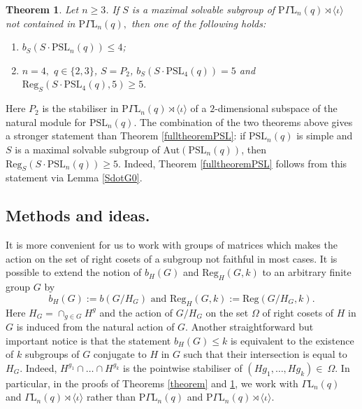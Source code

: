 \documentclass[a4paper,reqno,11pt]{amsart}
\newtheorem{mainthA}{Theorem}
\theoremstyle{definition}
\theoremstyle{remark}
\numberwithin{equation}{section}
\newcommand{\Reg}{\mathrm{Reg}}
\newcommand{\Aut}{\mathrm{Aut}}
\newcommand{\GaL}{{\Gamma \mathrm{L}}}
\newcommand{\PGaL}{{\mathrm{P}\Gamma \mathrm{L}}}
\newcommand{\PSL}{{\mathrm{PSL}}}
\begin{document}
\begin{mainthA}
\label{theoremGR}
Let $n\ge 3$. If $S$ is a maximal solvable subgroup of $\PGaL_n(q) \rtimes \langle \iota \rangle$ not contained in $\PGaL_n(q),$ then one of the following holds:
\begin{enumerate}
\item[$(1)$] $b_S(S \cdot \PSL_n(q))\le 4$;
\item[$(2)$] $n=4,$ $q\in \{2,3\}$, $S=P_2$, $b_S(S \cdot \PSL_4(q))=5$ and $\Reg_S(S \cdot \PSL_4(q),5)\ge 5.$
\end{enumerate}
\end{mainthA}

Here $P_2$ is the stabiliser in $\PGaL_n(q) \rtimes \langle \iota \rangle$ of a $2$-dimensional subspace of the natural module for $\PSL_n(q).$ The combination of the two theorems above gives a stronger statement than Theorem \ref{fulltheoremPSL}: if $\PSL_n(q)$ is simple and $S$ is a maximal solvable subgroup of $\Aut(\PSL_n(q))$, then $\Reg_S(S \cdot \PSL_n(q)) \ge 5.$ Indeed, Theorem \ref{fulltheoremPSL} follows from this statement via Lemma \ref{SdotG0}. 

\subsection{Methods and ideas.}\label{secmeth}

 It is more convenient for us to work with groups of matrices which makes the action  on the set of right cosets of a subgroup not faithful in most cases.  It is possible to extend the notion of $b_H(G)$ and $\Reg_H(G,k)$ to an arbitrary finite group $G$ by 
  $$b_H(G):=b(G/H_G) \text{ and } \Reg_H(G,k):=\Reg(G/H_G,k).$$
  Here $H_G = \cap_{g \in G} H^g$ and the action of $G/H_G$ on the set $\Omega$ of right cosets of $H$ in $G$ is induced from the natural action of $G$. Another straightforward but important notice is that the statement $b_H(G) \le k$ is equivalent to the existence of $k$  subgroups of $G$ conjugate to $H$ in $G$ such that their intersection is equal to $H_G.$ Indeed, $H^{g_1} \cap \ldots \cap H^{g_k}$ is the pointwise stabiliser of $(Hg_1, \ldots, Hg_k) \in~\Omega.$   In particular, in the proofs of Theorems \ref{theorem} and \ref{theoremGR}, we work with $\GaL_n(q)$ and $ \GaL_n(q) \rtimes \langle \iota \rangle $ rather than $\PGaL_n(q)$ and $\PGaL_n(q) \rtimes \langle \iota \rangle $.
\end{document}
